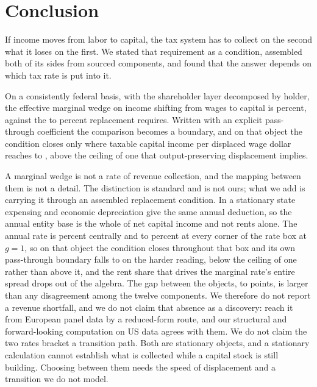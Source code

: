 \section{Conclusion}
\label{sec:conclusion}

If income moves from labor to capital, the tax system has to collect on the second what it loses
on the first. We stated that requirement as a condition, assembled both of its sides from sourced
components, and found that the answer depends on which tax rate is put into it.

On a consistently federal basis, with the shareholder layer decomposed by holder, the effective
marginal wedge on income shifting from wages to capital is  percent, against
the  to  percent replacement requires. Written with an explicit pass-through
coefficient the comparison becomes a boundary, and on that object the condition closes only where
taxable capital income per displaced wage dollar reaches  to
, above the ceiling of one that output-preserving displacement implies.

A marginal wedge is not a rate of revenue collection, and the mapping between them is not a
detail. The distinction is standard \citep{DevereuxGriffith2003} and is not ours; what we add is
carrying it through an assembled replacement condition. In a stationary state expensing and economic depreciation give the same annual deduction,
so the annual entity base is the whole of net capital income and not rents alone. The annual rate
is  percent centrally and  to 
percent at every corner of the rate box at $g = 1$, so on that object the condition closes
throughout that box and its own pass-through boundary falls to  on the harder
reading, below the ceiling of one rather than above it,
and the rent share that drives the marginal rate's entire spread drops out of the algebra. The
gap between the objects,  to  points, is
larger than any disagreement among the twelve components. We therefore do not report a revenue
shortfall, and we do not claim that absence as a discovery: \citet{HotteTheodorakopoulosKoutroumpis2024}
reach it from European panel data by a reduced-form route, and our structural and forward-looking
computation on US data agrees with them. We do not claim the two rates bracket a transition path.
Both are stationary objects, and a stationary calculation cannot establish what is collected
while a capital stock is still building. Choosing between them needs the speed of displacement
and a transition we do not model.

